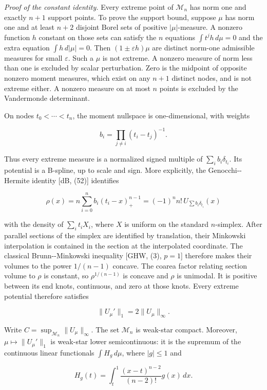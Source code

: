 \documentclass[11pt]{article}
\begin{document}
\emph{Proof of the constant identity.} Every extreme point of
\(\mathcal M_n\) has norm one and exactly \(n+1\) support points. To
prove the support bound, suppose \(\mu\) has norm one and at least
\(n+2\) disjoint Borel sets of positive \(|\mu|\)-measure. A nonzero
function \(h\) constant on those sets can satisfy the \(n\) equations
\(\int t^jh\,d\mu=0\) and the extra equation \(\int h\,d|\mu|=0\). Then
\((1\pm\varepsilon h)\mu\) are distinct norm-one admissible measures for
small \(\varepsilon\). Such a \(\mu\) is not extreme. A nonzero measure
of norm less than one is excluded by scalar perturbation. Zero is the
midpoint of opposite nonzero moment measures, which exist on any \(n+1\)
distinct nodes, and is not extreme either. A nonzero measure on at most
\(n\) points is excluded by the Vandermonde determinant.

On nodes \(t_0<\cdots<t_n\), the moment nullspace is one-dimensional,
with weights

\[
b_i=\prod_{j\ne i}(t_i-t_j)^{-1}.
\tag{24}
\]

Thus every extreme measure is a normalized signed multiple of
\(\sum_i b_i\delta_{t_i}\). Its potential is a B-spline, up to scale and
sign. More explicitly, the Genocchi-\/-Hermite identity {[}dB, (52){]}
identifies

\[
\rho(x)=n\sum_{i=0}^n b_i(t_i-x)_+^{n-1}
=(-1)^n n!\,U_{\sum b_i\delta_{t_i}}(x)
\tag{25}
\]

with the density of \(\sum_i t_iX_i\), where \(X\) is uniform on the
standard \(n\)-simplex. After parallel sections of the simplex are
identified by translation, their Minkowski interpolation is contained in
the section at the interpolated coordinate. The classical
Brunn-\/-Minkowski inequality {[}GHW, (3), \(p=1\){]} therefore makes
their volumes to the power \(1/(n-1)\) concave. The coarea factor
relating section volume to \(\rho\) is constant, so \(\rho^{1/(n-1)}\)
is concave and \(\rho\) is unimodal. It is positive between its end
knots, continuous, and zero at those knots. Every extreme potential
therefore satisfies

\[
\|U_\mu'\|_1=2\|U_\mu\|_\infty.
\tag{26}
\]

Write \(C=\sup_{\mathcal M_n}\|U_\mu\|_\infty\). The set
\(\mathcal M_n\) is weak-star compact. Moreover,
\(\mu\mapsto\|U_\mu'\|_1\) is weak-star lower semicontinuous: it is the
supremum of the continuous linear functionals \(\int H_g\,d\mu\), where
\(|g|\le1\) and

\[
H_g(t)=\int_t^1\frac{(x-t)^{n-2}}{(n-2)!}g(x)\,dx.
\tag{27}
\]
\end{document}
